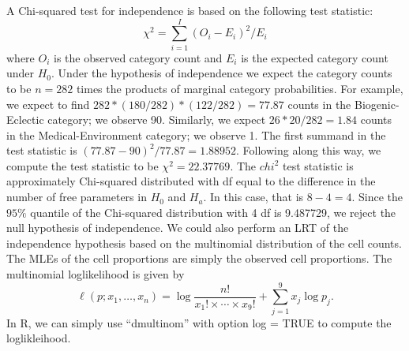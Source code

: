 \documentclass[
]{book}
\begin{document}
A Chi-squared test for independence is based on the following test statistic:
\[\chi^2 = \sum_{i=1}^I (O_i - E_i)^2 / E_i\]
where \(O_i\) is the observed category count and \(E_i\) is the expected category count under \(H_0\). Under the hypothesis of independence we expect the category counts to be \(n = 282\) times the products of marginal category probabilities. For example, we expect to find \(282 *(180/282)*(122/282) = 77.87\) counts in the Biogenic-Eclectic category; we observe 90. Similarly, we expect \(26*20/282 = 1.84\) counts in the Medical-Environment category; we observe 1. The first summand in the test statistic is \((77.87 - 90)^2 / 77.87 = 1.88952\). Following along this way, we compute the test statistic to be \(\chi^2 = 22.37769\). The \(chi^2\) test statistic is approximately Chi-squared distributed with df equal to the difference in the number of free parameters in \(H_0\) and \(H_a\). In this case, that is \(8 - 4 = 4\). Since the \(95\%\) quantile of the Chi-squared distribution with 4 df is 9.487729, we reject the null hypothesis of independence.
We could also perform an LRT of the independence hypothesis based on the multinomial distribution of the cell counts. The MLEs of the cell proportions are simply the observed cell proportions. The multinomial loglikelihood is given by
\[\ell(p;x_1, \ldots, x_n) = \log \frac{n!}{x_1!\times \cdots \times x_9!} + \sum_{j=1}^9 x_j\log p_j.\]
In R, we can simply use ``dmultinom'' with option log = TRUE to compute the loglikleihood.
\end{document}

